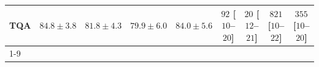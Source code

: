 \begin{tabular}{l|cccc|cccc|}
TQA & {\cellcolor[HTML]{0567A2}} \color[HTML]{F1F1F1} $84.8\pm 3.8$ & {\cellcolor[HTML]{0F76B3}} \color[HTML]{F1F1F1} $81.8\pm 4.3$ & {\cellcolor[HTML]{2081B9}} \color[HTML]{F1F1F1} $79.9\pm 6.0$ & {\cellcolor[HTML]{056BA7}} \color[HTML]{F1F1F1} $84.0\pm 5.6$ & {\cellcolor[HTML]{FDE4E1}} \color[HTML]{000000} $92$ [$10$--$20$] & {\cellcolor[HTML]{FFF4F0}} \color[HTML]{000000} $20$ [$12$--$21$] & {\cellcolor[HTML]{4B006A}} \color[HTML]{F1F1F1} $821$ [$10$--$22$] & {\cellcolor[HTML]{F98AAD}} \color[HTML]{000000} $355$ [$10$--$20$] \\
\cline{1-9}
\bottomrule
\end{tabular}
